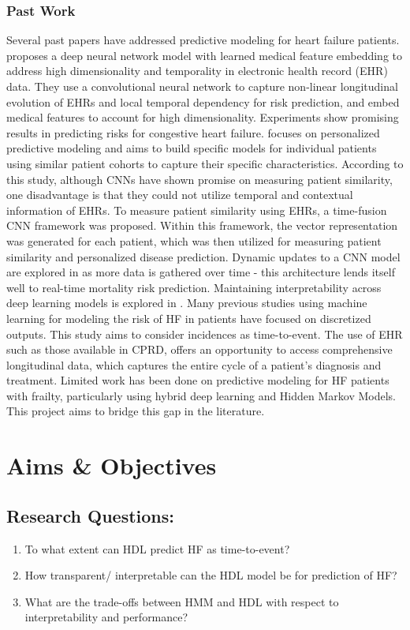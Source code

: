 \documentclass[%
 reprint,
 amsmath,amssymb,
 aps,
 nofootinbib,
]{revtex4-2}
\theoremstyle{definition}
\begin{document}
\subsubsection{\label{pastwork}Past Work}
Several past papers have addressed predictive modeling for heart failure patients. \citep{che2017} proposes a deep neural network model with learned medical feature embedding to address high dimensionality and temporality in electronic health record (EHR) data. They use a convolutional neural network to capture non-linear longitudinal evolution of EHRs and local temporal dependency for risk prediction, and embed medical features to account for high dimensionality. Experiments show promising results in predicting risks for congestive heart failure. \citep{suo2017personalized} focuses on personalized predictive modeling and aims to build specific models for individual patients using similar patient cohorts to capture their specific characteristics. According to this study, although CNNs have shown promise on measuring patient similarity, one disadvantage is that they could not utilize temporal and contextual information of EHRs. To measure patient similarity using EHRs, a time-fusion CNN framework was proposed. Within this framework, the vector representation was generated for each patient, which was then utilized for measuring patient similarity and personalized disease prediction. Dynamic updates to a CNN model are explored in \citep{brand2018real} as more data is gathered over time - this architecture lends itself well to real-time mortality risk prediction. Maintaining interpretability across deep learning models is explored in \citep{caicedo2019iseeu}. Many previous studies using machine learning for modeling the risk of HF in patients have focused on discretized outputs. This study aims to consider incidences as time-to-event. The use of EHR such as those available in CPRD, offers an opportunity to access comprehensive longitudinal data, which captures the entire cycle of a patient's diagnosis and treatment. Limited work has been done on predictive modeling for HF patients with frailty, particularly using hybrid deep learning and Hidden Markov Models. This project aims to bridge this gap in the literature.

\section{\label{aimsobj}Aims \& Objectives}

\subsection{Research Questions:}
\begin{enumerate}
\item To what extent can HDL predict HF as time-to-event?
\item How transparent/ interpretable can the HDL model be for prediction of HF?
\item What are the trade-offs between HMM and HDL with respect to interpretability and performance?
\end{enumerate}
\end{document}
